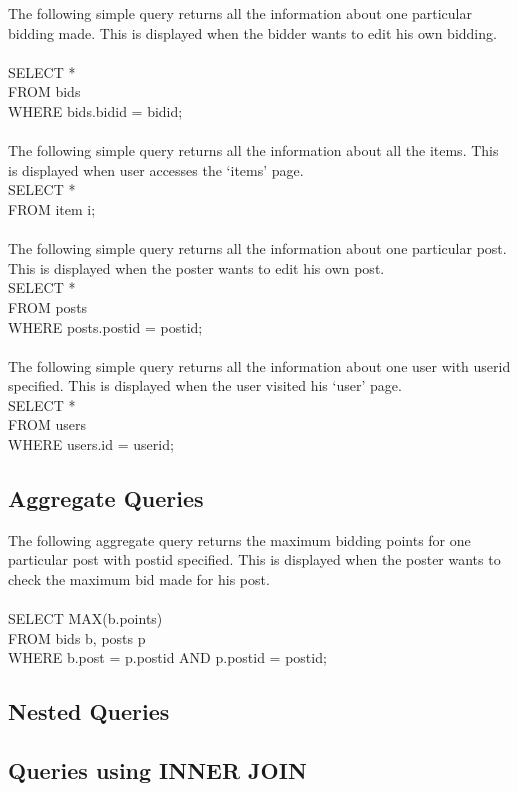 The following simple query returns all the information about one particular bidding made. This is displayed when the bidder wants to edit his own bidding.\\
\\
SELECT * \\
FROM bids\\
WHERE bids.bidid = bidid;\\\\
The following simple query returns all the information about all the items. This is displayed when user accesses the `items' page.\\
SELECT * \\
FROM item i;\\\\
The following simple query returns all the information about one particular post. This is displayed when the poster wants to edit his own post.\\
SELECT * \\
FROM posts \\
WHERE posts.postid = postid;\\\\
The following simple query returns all the information about one user with userid specified. This is displayed when the user visited his `user' page.\\
SELECT * \\
FROM users \\
WHERE users.id = userid;\\

\subsection{Aggregate Queries}
The following aggregate query returns the maximum bidding points for one particular post with postid specified. This is displayed when the poster wants to check the maximum bid made for his post.\\\\
SELECT MAX(b.points)\\
FROM bids b, posts p\\
WHERE b.post = p.postid AND p.postid = postid;\\

\subsection{Nested Queries}

\subsection{Queries using INNER JOIN}

